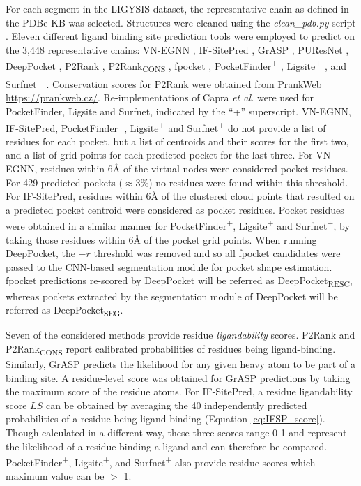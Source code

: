 For each segment in the LIGYSIS dataset, the representative chain as defined in the PDBe-KB was selected. Structures were cleaned using the \textit{clean\_pdb.py} script \cite{JUBB_2019_PDBTOOLS}. Eleven different ligand binding site prediction tools were employed to predict on the 3,448 representative chains: VN-EGNN \cite{SESTAK_2024_VNEGNN}, IF-SitePred \cite{CARBERY_2024_IFSP}, GrASP \cite{SMITH_2024_GrASP}, PUResNet \cite{KANDEL_2021_PURESNET, KANDEL_2024_PURESNET}, DeepPocket \cite{AGGARWAL_2022_DEEPPOCKET}, P2Rank \cite{KRIVAK_2015_P2RANK, KRIVAK_2018_P2RANK}, P2Rank\textsubscript{CONS} \cite{JENDELE_2019_PRANKWEB, JAKUBEC_2022_PRANKWEB}, fpocket \cite{GUILLOUX_2009_FPOCKET, SCHMIDTKE_2010_FPOCKET2}, PocketFinder\textsuperscript{+} \cite{AN_2005_POCKETFINDER}, Ligsite\textsuperscript{+} \cite{HENDLICH_1997_LIGSITE}, and Surfnet\textsuperscript{+} \cite{LASKOWSKI_1995_SURFNET}. Conservation scores for P2Rank were obtained from PrankWeb \url{https://prankweb.cz/}. Re-implementations of Capra \textit{et al.} \cite{CAPRA_2009_CONCAVITY} were used for PocketFinder, Ligsite and Surfnet, indicated by the ``+'' superscript. VN-EGNN, IF-SitePred, PocketFinder\textsuperscript{+}, Ligsite\textsuperscript{+} and Surfnet\textsuperscript{+} do not provide a list of residues for each pocket, but a list of centroids and their scores for the first two, and a list of grid points for each predicted pocket for the last three. For VN-EGNN, residues within 6\AA{} of the virtual nodes were considered pocket residues. For 429 predicted pockets ($\approx$3\%) no residues were found within this threshold. For IF-SitePred, residues within 6\AA{} of the clustered cloud points that resulted on a predicted pocket centroid were considered as pocket residues. Pocket residues were obtained in a similar manner for PocketFinder\textsuperscript{+}, Ligsite\textsuperscript{+} and Surfnet\textsuperscript{+}, by taking those residues within 6\AA{} of the pocket grid points. When running DeepPocket, the $-r$ threshold was removed and so all fpocket candidates were passed to the CNN-based segmentation module for pocket shape estimation. fpocket predictions re-scored by DeepPocket will be referred as DeepPocket\textsubscript{RESC}, whereas pockets extracted by the segmentation module of DeepPocket will be referred as DeepPocket\textsubscript{SEG}.

Seven of the considered methods provide residue \textit{ligandability} scores. P2Rank and P2Rank\textsubscript{CONS} report calibrated probabilities of residues being ligand-binding. Similarly, GrASP predicts the likelihood for any given heavy atom to be part of a binding site. A residue-level score was obtained for GrASP predictions by taking the maximum score of the residue atoms. For IF-SitePred, a residue ligandability score $LS$ can be obtained by averaging the 40 independently predicted probabilities of a residue being ligand-binding (Equation \ref{eq:IFSP_score}). Though calculated in a different way, these three scores range 0-1 and represent the likelihood of a residue binding a ligand and can therefore be compared. PocketFinder\textsuperscript{+}, Ligsite\textsuperscript{+}, and Surfnet\textsuperscript{+} also provide residue scores which maximum value can be $>$ 1.

